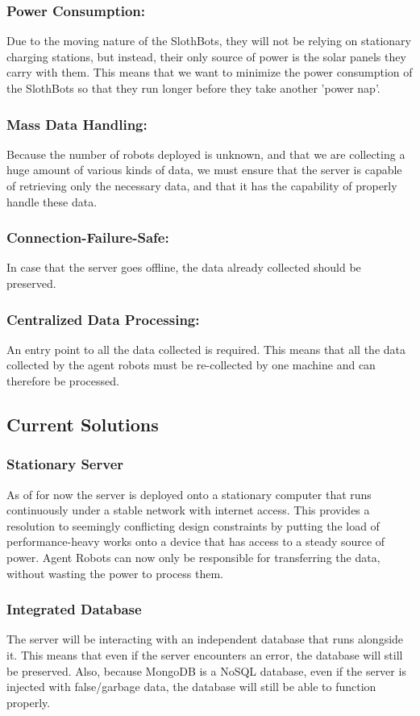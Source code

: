 \documentclass{article}
\begin{document}
\subsubsection{Power Consumption: } Due to the moving nature of the SlothBots, they will not be relying on stationary charging stations, but instead, their only source of power is 
the solar panels they carry with them. This means that we want to minimize the power consumption of the SlothBots so that they run longer before they take another 'power nap'.
\subsubsection{Mass Data Handling: } Because the number of robots deployed is unknown, and that we are collecting a huge amount of various kinds of data, we must ensure that the server
is capable of retrieving only the necessary data, and that it has the capability of properly handle these data.
\subsubsection{Connection-Failure-Safe: } In case that the server goes offline, the data already collected should be preserved. 
\subsubsection{Centralized Data Processing: } An entry point to all the data collected is required. This means that all the data collected by the agent robots must be re-collected by one 
machine and can therefore be processed.

\subsection{Current Solutions}
\subsubsection{Stationary Server} As of for now the server is deployed onto a stationary computer that runs continuously under a stable network with internet access.
This provides a resolution to seemingly conflicting design constraints by putting the load of performance-heavy works onto a device that has access to a steady source of power.
Agent Robots can now only be responsible for transferring the data, without wasting the power to process them.
\subsubsection{Integrated Database} The server will be interacting with an independent database that runs alongside it. This means that even if the server encounters an error, the database will still be preserved.
Also, because MongoDB is a NoSQL database, even if the server is injected with false/garbage data, the database will still be able to function properly.
\end{document}
